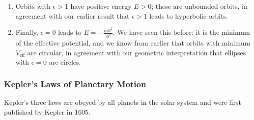 \documentclass[11pt, a4paper]{article}
\newcommand{\veff}{V_{\text{eff}}}  %
\begin{document}
\begin{itemize}
\begin{enumerate}
		\item Orbits with $ \epsilon > 1 $ have positive energy $ E > 0 $; these are unbounded orbits, in agreement with our earlier result that $ \epsilon > 1 $ leads to hyperbolic orbits.
		
		\item Finally, $ \epsilon = 0 $ leads to $ E = - \frac{mk^{2}}{2l^{2}} $. We have seen this before: it is the minimum of the effective potential, and we know from earlier that orbits with minimum $ \veff $ are circular, in agreement with our geometric interpretation that ellipses with $ \epsilon = 0 $ are circles.
		
	\end{enumerate}
\end{itemize}

\subsubsection{Kepler's Laws of Planetary Motion}
Kepler's three laws are obeyed by all planets in the solar system and were first published by Kepler in 1605.
\end{document}
